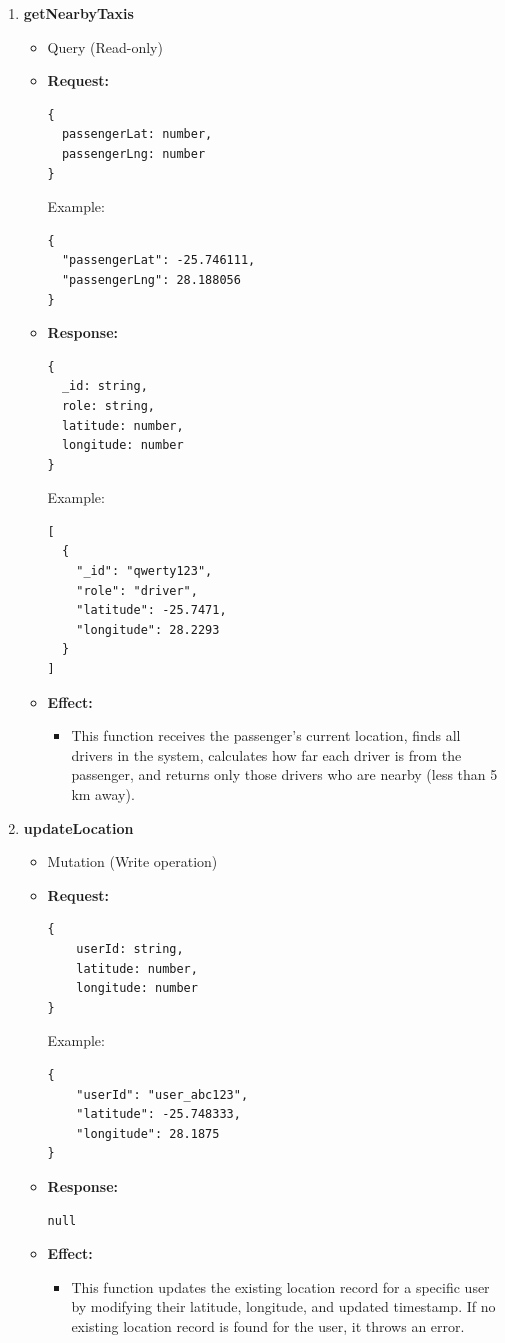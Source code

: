 \documentclass[a4paper,12pt]{article}
\begin{document}
\begin{enumerate}    
  \item \textbf{getNearbyTaxis}
    \begin{itemize}
      \item Query (Read-only)
      \item \textbf{Request:}
      \begin{verbatim}
{
  passengerLat: number,
  passengerLng: number
}
      \end{verbatim}
      Example:
      \begin{verbatim}
{
  "passengerLat": -25.746111,
  "passengerLng": 28.188056
}
      \end{verbatim}
      \item \textbf{Response:}
      \begin{verbatim}
{
  _id: string,
  role: string,
  latitude: number,
  longitude: number
}
      \end{verbatim}
      Example:
      \begin{verbatim}
[
  {
    "_id": "qwerty123",
    "role": "driver",
    "latitude": -25.7471,
    "longitude": 28.2293
  }
]
      \end{verbatim}
      \item \textbf{Effect:}
      \begin{itemize}
        \item This function receives the passenger's current location, finds all drivers in the system, calculates how far each driver is from the passenger, and returns only those drivers who are nearby (less than 5 km away).
      \end{itemize}
    \end{itemize}

    \item \textbf{updateLocation}
    \begin{itemize}
        \item Mutation (Write operation)
        \item \textbf{Request:}
        \begin{verbatim}
{
    userId: string,
    latitude: number,
    longitude: number
}
        \end{verbatim}
        Example:
        \begin{verbatim}
{
    "userId": "user_abc123",
    "latitude": -25.748333,
    "longitude": 28.1875
}
        \end{verbatim}
        \item \textbf{Response:}
        \begin{verbatim}
null
        \end{verbatim}
        \item \textbf{Effect:}
        \begin{itemize}
            \item This function updates the existing location record for a specific user by modifying their latitude, longitude, and updated timestamp. If no existing location record is found for the user, it throws an error.
        \end{itemize}
    \end{itemize}


\end{enumerate}
\end{document}
